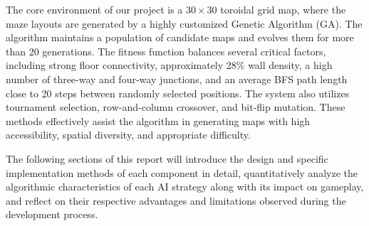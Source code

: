 The core environment of our project is a $30 \times 30$ toroidal grid map, where the maze layouts are generated by a highly customized Genetic Algorithm (GA). The algorithm maintains a population of candidate maps and evolves them for more than 20 generations. The fitness function balances several critical factors, including strong floor connectivity, approximately 28\% wall density, a high number of three-way and four-way junctions, and an average BFS path length close to 20 steps between randomly selected positions. The system also utilizes tournament selection, row-and-column crossover, and bit-flip mutation. These methods effectively assist the algorithm in generating maps with high accessibility, spatial diversity, and appropriate difficulty.

The following sections of this report will introduce the design and specific implementation methods of each component in detail, quantitatively analyze the algorithmic characteristics of each AI strategy along with its impact on gameplay, and reflect on their respective advantages and limitations observed during the development process.
